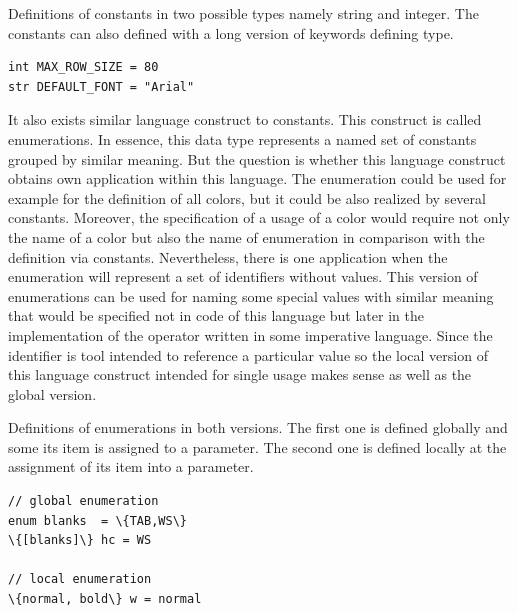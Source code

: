 \documentclass[12pt,notitlepage,a4paper]{report}
\begin{document}
\begin{expl}\label{Constants}
Definitions of constants in two possible types namely string and integer. The constants can also defined with a long version of keywords defining type.
\begingroup
\fontsize{10pt}{12pt}
\begin{Verbatim}[commandchars=\\\{\}]
int MAX_ROW_SIZE = 80
str DEFAULT_FONT = "Arial"
\end{Verbatim}
\endgroup
\end{expl}

It also exists similar language construct to constants. This construct is called enumerations. In essence, this data type represents a named set of constants grouped by similar meaning. But the question is whether this language construct obtains own application within this language. The enumeration could be used for example for the definition of all colors, but it could be also realized by several constants. Moreover, the specification of a usage of a color would require not only the name of a color but also the name of enumeration in comparison with the definition via constants. Nevertheless, there is one application when the enumeration will represent a set of identifiers without values. This version of enumerations  can be used for naming some special values with similar meaning  that would be specified not in code of this language but later in the implementation of the operator written in some imperative language. Since the identifier is tool intended to reference a particular value so the local version of this language construct intended for single usage makes sense as well as the global version.  

\begin{expl}\label{Enumerations}
Definitions of enumerations in both versions. The first one is defined globally and some its item is assigned to a parameter. The second one is defined locally at the assignment of its item into a parameter.  
\begingroup
\fontsize{10pt}{12pt}
\begin{Verbatim}[commandchars=\\\{\}]
// global enumeration
enum blanks  = \{TAB,WS\}
\{[blanks]\} hc = WS

// local enumeration
\{normal, bold\} w = normal
\end{Verbatim}
\endgroup
\end{expl}
\end{document}
